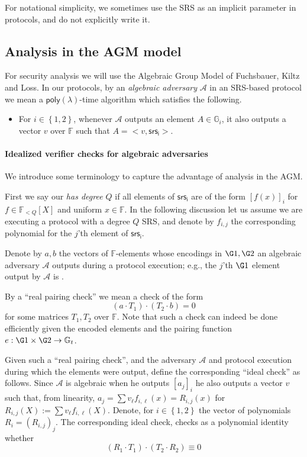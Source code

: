 \documentclass[11pt]{article} %
\newcommand{\Gi}{\ensuremath{{\mathbb G}_i}\xspace}
\newcommand{\Gt}{\ensuremath{{\mathbb G}_t}\xspace}
\newcommand{\F}{\ensuremath{\mathbb F}\xspace}
\newcommand{\adv}{\ensuremath{\mathcal A}\xspace}
\newcommand{\srsi}{\ensuremath{\mathsf{srs_i}}\xspace}
\newcommand{\defeq}{:=}
\newcommand{\enci}[1]{\ensuremath{\left[#1\right]_i}\xspace}
\newcommand{\set}[1]{\ensuremath{\left\{#1\right\}}\xspace}
\newcommand{\polysofdeg}[1]{\ensuremath{\F_{< #1}[X]}\xspace}
\newcommand{\poly}{\ensuremath{\mathsf{poly(\lambda)}}\xspace}
\begin{document}
For notational simplicity, we sometimes use the SRS  as an implicit parameter in protocols, and do not explicitly write it.

\subsection{Analysis in the AGM model}\label{subsec:AGM}
For security analysis we will use the Algebraic Group Model of Fuchsbauer, Kiltz and Loss\cite{AGM}.
In our protocols, by an \emph{algebraic adversary} \adv in an SRS-based protocol we mean a \poly-time algorithm which satisfies the following.
\begin{itemize}
 \item For $i\in \set{1,2}$, whenever \adv outputs an element $A\in \Gi$, it also outputs a vector $v$ over \F such that $A = <v,\srsi>$.
\end{itemize}

\paragraph{Idealized verifier checks for algebraic adversaries}
We introduce some terminology to capture the advantage of analysis in the AGM.

First we say our  \emph{has degree $Q$} if all elements of \srsi are of the form  \enci{f(x)} for $f\in \polysofdeg{Q}$ and uniform $x\in \F$. In the following discussion let us assume we are executing a protocol with a degree $Q$ SRS, and denote by $f_{i,j}$ the corresponding polynomial for the $j$'th element of \srsi.

Denote by $a,b$ the vectors of $\F$-elements whose encodings in $\G1,\G2$ an algebraic adversary \adv outputs during a protocol execution; e.g., the $j$'th $\G1$ element output by \adv is .

By a ``real pairing check'' we mean a check of the form
\[(a\cdot T_1) \cdot (T_2\cdot b)=0\]
for some matrices $T_1,T_2$ over $\F$.
Note that such a check can indeed be done efficiently given the encoded elements and the pairing function $e:\G1\times \G2\to \Gt$.



Given such a ``real pairing check'', and the adversary \adv and protocol execution during which the elements were output, define the corresponding ``ideal check'' as follows.
Since \adv is algebraic when he outputs \enci{a_j} he also outputs a vector $v$ such that, from linearity, $a_j = \sum v_\ell f_{i,\ell}(x)=R_{i,j}(x)$ for $R_{i,j}(X) \defeq \sum v_\ell f_{i,\ell}(X)$.
Denote, for $i\in \set{1,2}$ the vector of polynomials $R_i=(R_{i,j})_j$.
The corresponding ideal check, checks as a polynomial identity whether
\[(R_1 \cdot T_1)\cdot (T_2\cdot R_2) \equiv 0\]
\end{document}
